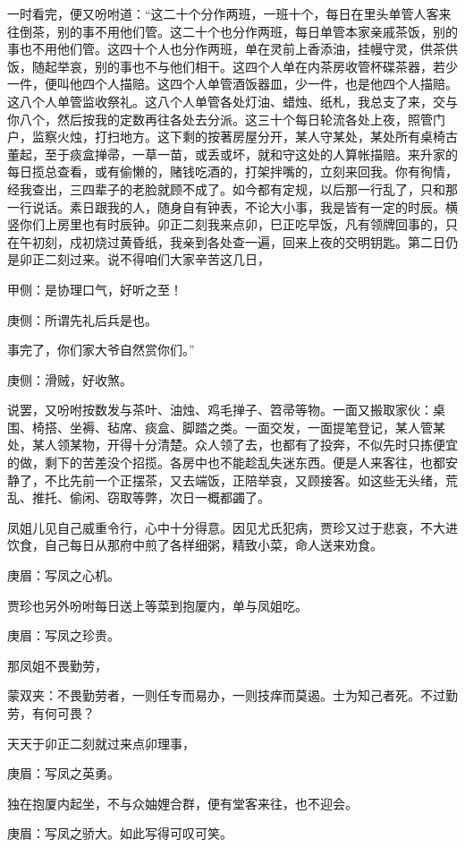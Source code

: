 \begin{parag}
    一时看完，便又吩咐道：“这二十个分作两班，一班十个，每日在里头单管人客来往倒茶，别的事不用他们管。这二十个也分作两班，每日单管本家亲戚茶饭，别的事也不用他们管。这四十个人也分作两班，单在灵前上香添油，挂幔守灵，供茶供饭，随起举哀，别的事也不与他们相干。这四个人单在内茶房收管杯碟茶器，若少一件，便叫他四个人描赔。这四个人单管酒饭器皿，少一件，也是他四个人描赔。这八个人单管监收祭礼。这八个人单管各处灯油、蜡烛、纸札，我总支了来，交与你八个，然后按我的定数再往各处去分派。这三十个每日轮流各处上夜，照管门户，监察火烛，打扫地方。这下剩的按著房屋分开，某人守某处，某处所有桌椅古董起，至于痰盒掸帚，一草一苗，或丢或坏，就和守这处的人算帐描赔。来升家的每日揽总查看，或有偷懒的，赌钱吃酒的，打架拌嘴的，立刻来回我。你有徇情，经我查出，三四辈子的老脸就顾不成了。如今都有定规，以后那一行乱了，只和那一行说话。素日跟我的人，随身自有钟表，不论大小事，我是皆有一定的时辰。横竖你们上房里也有时辰钟。卯正二刻我来点卯，巳正吃早饭，凡有领牌回事的，只在午初刻，戍初烧过黄昏纸，我亲到各处查一遍，回来上夜的交明钥匙。第二日仍是卯正二刻过来。说不得咱们大家辛苦这几日，\begin{note}甲侧：是协理口气，好听之至！\end{note}\begin{note}庚侧：所谓先礼后兵是也。\end{note}事完了，你们家大爷自然赏你们。”\begin{note}庚侧：滑贼，好收煞。\end{note}
\end{parag}


\begin{parag}
    说罢，又吩咐按数发与茶叶、油烛、鸡毛掸子、笤帚等物。一面又搬取家伙：桌围、椅搭、坐褥、毡席、痰盒、脚踏之类。一面交发，一面提笔登记，某人管某处，某人领某物，开得十分清楚。众人领了去，也都有了投奔，不似先时只拣便宜的做，剩下的苦差没个招揽。各房中也不能趁乱失迷东西。便是人来客往，也都安静了，不比先前一个正摆茶，又去端饭，正陪举哀，又顾接客。如这些无头绪，荒乱、推托、偷闲、窃取等弊，次日一概都蠲了。
\end{parag}


\begin{parag}
    凤姐儿见自己威重令行，心中十分得意。因见尤氏犯病，贾珍又过于悲哀，不大进饮食，自己每日从那府中煎了各样细粥，精致小菜，命人送来劝食。\begin{note}庚眉：写凤之心机。\end{note}贾珍也另外吩咐每日送上等菜到抱厦内，单与凤姐吃。\begin{note}庚眉：写凤之珍贵。\end{note}那凤姐不畏勤劳，\begin{note}蒙双夹：不畏勤劳者，一则任专而易办，一则技痒而莫遏。士为知己者死。不过勤劳，有何可畏？\end{note}天天于卯正二刻就过来点卯理事，\begin{note}庚眉：写凤之英勇。\end{note}独在抱厦内起坐，不与众妯娌合群，便有堂客来往，也不迎会。\begin{note}庚眉：写凤之骄大。如此写得可叹可笑。\end{note}
\end{parag}


